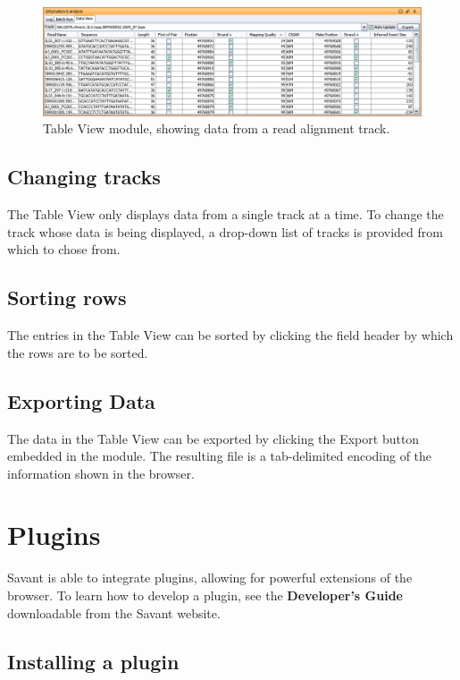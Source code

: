 \documentclass{report}
\begin{document}
\begin{figure}[!h]
\begin{center}
\includegraphics[type=png,ext=.png,read=.png,width=16cm]{images/tableview}
\caption{Table View module, showing data from a read alignment track.}
\label{rangecontrolpanel}
\end{center}
\end{figure}

\section{Changing tracks}

The Table View only displays data from a single track at a time. To change the track whose data is being displayed, a drop-down list of tracks is provided from which to chose from.

\section{Sorting rows}

The entries in the Table View can be sorted by clicking the field header by which the rows are to be sorted.

\section{Exporting Data}

The data in the Table View can be exported by clicking the Export button embedded in the module. The resulting file is a tab-delimited encoding of the information shown in the browser.

\chapter{Plugins}

Savant is able to integrate plugins, allowing for powerful extensions of the browser. To learn how to develop a plugin, see the {\bf Developer's Guide} downloadable from the Savant website.

\section{Installing a plugin}
\end{document}
